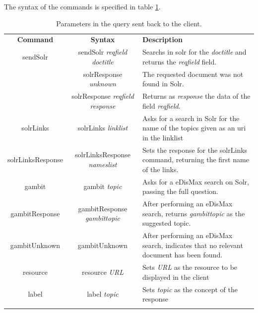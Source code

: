 The syntax of the commands is specified in table \ref{tab:oob-commands}.
\begin{center}
  \centering
  \begin{table}
    \begin{tabular*}{0.7\textwidth}{@{\extracolsep{\fill}} | c | c | p{} |}
      \hhline{|-|-|-|}
      \textbf{Command} & \textbf{Syntax} & \textbf{Description} \\ \hhline{|=|=|=|}
      sendSolr & sendSolr \textit{reqfield} \textit{doctitle} & Searchs in solr for the \textit{doctitle} and returns the \textit{reqfield} field.  \\ \hhline{|-|-|-|}
      \multirow{2}{*}{solrResponse} & solrResponse \textit{unknown} & The requested document was not found in Solr. \\ \cline{2-3}
				     & solrResponse \textit{reqfield} \textit{response} & Returns as \textit{response} the data of the field \textit{reqfield}. \\ \hhline{|-|-|-|}
      solrLinks & solrLinks \textit{linklist} & Asks for a search in Solr for the name of the topics given as an uri in the linklist \\ \hhline{|-|-|-|}
      solrLinksResponse & solrLinksResponse \textit{nameslist} & Sets the response for the solrLinks command, returning the first name of the links. \\ \hhline{|-|-|-|}
      gambit & gambit \textit{topic}& Asks for a \ac{eDisMax} search on Solr, passing the full question. \\ \hhline{|-|-|-|}
      gambitResponse & gambitResponse \textit{gambittopic} & After performing an \ac{eDisMax} search, returns \textit{gambittopic} as the suggested topic. \\ \hhline{|-|-|-|}
      gambitUnknown & gambitUnknown & After performing an \ac{eDisMax} search, indicates that no relevant document has been found. \\ \hhline{|-|-|-|}
      resource & resource \textit{URL} & Sets \textit{URL} as the resource to be displayed in the client \\ \hhline{|-|-|-|}
      label & label \textit{topic} & Sets \textit{topic} as the concept of the response \\ \hhline{|-|-|-|}
      \end{tabular*}
    \caption{Parameters in the query sent back to the client.}
    \label{tab:oob-commands}
  \end{table}
\end{center}

